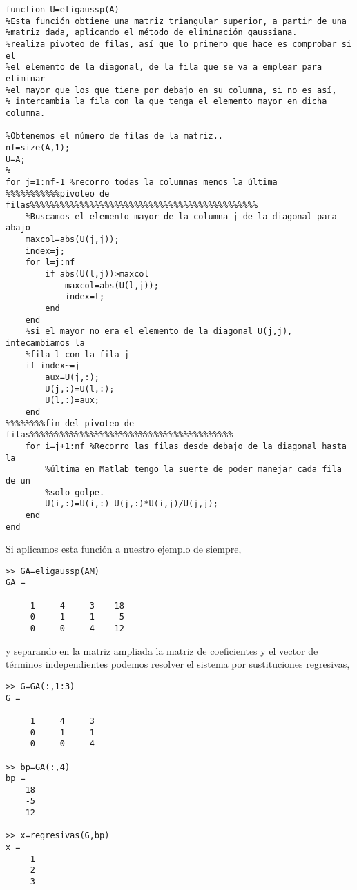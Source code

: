 \begin{verbatim}
function U=eligaussp(A)
%Esta función obtiene una matriz triangular superior, a partir de una
%matriz dada, aplicando el método de eliminación gaussiana.
%realiza pivoteo de filas, así que lo primero que hace es comprobar si el
%el elemento de la diagonal, de la fila que se va a emplear para eliminar
%el mayor que los que tiene por debajo en su columna, si no es así,
% intercambia la fila con la que tenga el elemento mayor en dicha columna.

%Obtenemos el número de filas de la matriz..
nf=size(A,1);
U=A;
%
for j=1:nf-1 %recorro todas la columnas menos la última
%%%%%%%%%%%pivoteo de filas%%%%%%%%%%%%%%%%%%%%%%%%%%%%%%%%%%%%%%%%%%%%%%    
    %Buscamos el elemento mayor de la columna j de la diagonal para abajo
    maxcol=abs(U(j,j));
    index=j;
    for l=j:nf
        if abs(U(l,j))>maxcol
            maxcol=abs(U(l,j));
            index=l;
        end
    end
    %si el mayor no era el elemento de la diagonal U(j,j), intecambiamos la
    %fila l con la fila j
    if index~=j
        aux=U(j,:);
        U(j,:)=U(l,:);
        U(l,:)=aux;
    end
%%%%%%%%fin del pivoteo de filas%%%%%%%%%%%%%%%%%%%%%%%%%%%%%%%%%%%%%%%%%    
    for i=j+1:nf %Recorro las filas desde debajo de la diagonal hasta la 
        %última en Matlab tengo la suerte de poder manejar cada fila de un 
        %solo golpe.
        U(i,:)=U(i,:)-U(j,:)*U(i,j)/U(j,j);
    end
end
\end{verbatim}

Si aplicamos esta función a nuestro ejemplo de siempre,
\begin{verbatim}
>> GA=eligaussp(AM)
GA =

     1     4     3    18
     0    -1    -1    -5
     0     0     4    12
\end{verbatim}

y separando en la matriz ampliada la matriz de coeficientes y el vector de términos independientes podemos resolver el sistema por sustituciones regresivas,

\begin{verbatim}
>> G=GA(:,1:3)
G =

     1     4     3
     0    -1    -1
     0     0     4

>> bp=GA(:,4)
bp =
    18
    -5
    12

>> x=regresivas(G,bp)
x =
     1
     2
     3

\end{verbatim}

